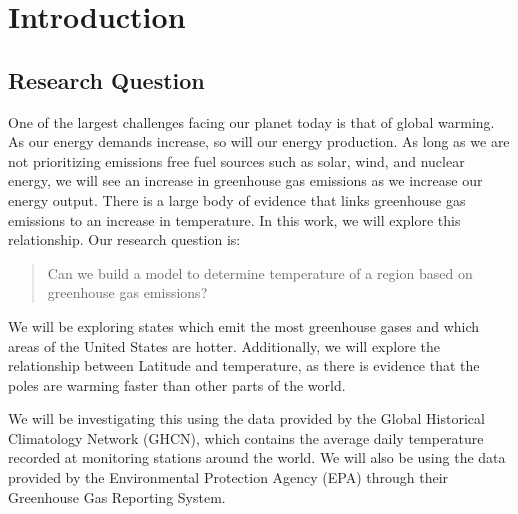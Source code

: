 \section{Introduction}
\subsection{Research Question}
One of the largest challenges facing our planet today is that of global warming. As our energy demands increase, so will our energy production. As long as we are not prioritizing emissions free fuel sources such as solar, wind, and nuclear energy, we will see an increase in greenhouse gas emissions as we increase our energy output. There is a large body of evidence that links greenhouse gas emissions to an increase in temperature. In this work, we will explore this relationship. Our research question is:

\begin{quote}
    Can we build a model to determine temperature of a region based on greenhouse gas emissions?
\end{quote}
We will be exploring states which emit the most greenhouse gases and which areas of the United States are hotter. Additionally, we will explore the relationship between Latitude and temperature, as there is evidence that the poles are warming faster than other parts of the world. 

We will be investigating this using the data provided by the Global Historical Climatology Network (GHCN), which contains the average daily temperature recorded at monitoring stations around the world. We will also be using the data provided by the Environmental Protection Agency (EPA) through their Greenhouse Gas Reporting System. 